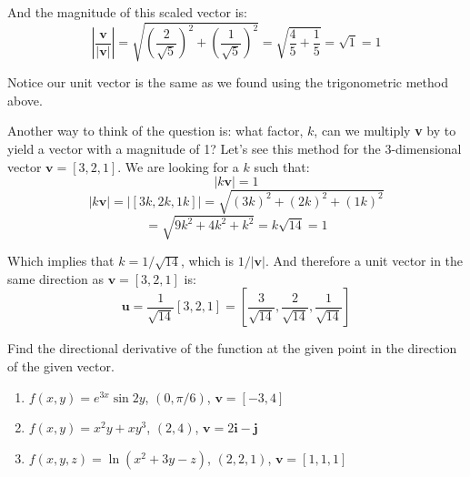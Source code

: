 And the magnitude of this scaled vector is:
$$ \left| \frac{\textbf{v}}{| \textbf{v} |} \right| = \sqrt{\left( \frac{2}{\sqrt{5}} \right)^2 + \left( \frac{1}{\sqrt{5}} \right)^2} = \sqrt{\frac{4}{5} + \frac{1}{5}} = \sqrt{1} = 1$$

Notice our unit vector is the same as we found using the trigonometric method above. 

Another way to think of the question is: what factor, $k$, can we multiply \textbf{v} by to yield a vector with a magnitude of 1? Let's see this method for the 3-dimensional vector $\textbf{v} = \left[ 3, 2, 1 \right]$. We are looking for a $k$ such that:
$$|k\textbf{v}| = 1$$
$$|k \textbf{v}| = \left| \left[ 3k, 2k, 1k \right] \right| = \sqrt{\left( 3k \right)^2 + \left( 2k \right)^2 + \left( 1k \right)^2}$$
$$= \sqrt{9k^2 + 4k^2 + k^2} = k\sqrt{14} = 1$$

Which implies that $k = 1/\sqrt{14}$, which is $1/|\textbf{v}|$. And therefore a unit vector in the same direction as $\textbf{v} = \left[ 3, 2, 1 \right]$ is:
$$\textbf{u} = \frac{1}{\sqrt{14}} \left[ 3, 2, 1 \right] = \left[ \frac{3}{\sqrt{14}}, \frac{2}{\sqrt{14}}, \frac{1}{\sqrt{14}} \right]$$


\begin{Exercise}[title = {Finding Directional Derivatives}, label = direction]
Find the directional derivative of the function at the given point in the 
direction of the given vector. 
\begin{enumerate}
    \item $f(x, y) = e^{3x} \sin{2y}$, $(0, \pi/6)$, $\textbf{v} = \left[ -3, 
    4 \right]$
    \item $f(x, y) = x^2y + xy^3$, $(2, 4)$, $\textbf{v} = 2 \textbf{i} - 
    \textbf{j}$
    \item $f(x, y, z) = \ln{ \left( x^2 + 3y - z \right)}$, $(2, 2, 1)$, 
    $\textbf{v} = \left[ 1, 1, 1 \right]$
\end{enumerate}
\vspace{100mm}
\end{Exercise}

